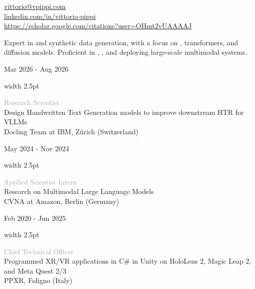 \documentclass[10pt,a4paper]{article}
\newcommand{\cvsection}[1]{
    \vspace{2.2ex}
    \noindent{\Large \textcolor{darkgray}{#1}}
    \vspace{0.8ex}\par
}
\newcommand{\cventry}[3]{
    \par\noindent
    \begin{minipage}[t]{0.19\textwidth}
        \raggedleft \footnotesize \textcolor{textgray}{#2}
    \end{minipage}%
    \hspace{0.015\textwidth}%
    \textcolor{#1}{\vrule width 2.5pt}%
    \hspace{0.015\textwidth}%
    \begin{minipage}[t]{0.75\textwidth}
        \footnotesize #3
    \end{minipage}
    \par\vspace{0.6ex}
}
\begin{document}
\pagestyle{empty}
\linespread{0.95}\selectfont

\noindent{\huge \textcolor{darkgray}{Vittorio Pippi}}\vspace{1.2ex}

\noindent
\footnotesize
\textcolor{linkgray}{\faEnvelope} \hspace{0.5ex} \href{mailto:vittorio@vpippi.com}{\underline{\textcolor{linkgray}{vittorio@vpippi.com}}} \hspace{2ex} \\
\textcolor{linkgray}{\faLinkedin} \hspace{0.5ex} \href{https://www.linkedin.com/in/vittorio-pippi/}{\underline{\textcolor{linkgray}{linkedin.com/in/vittorio-pippi}}} \\
\textcolor{linkgray}{\faGraduationCap} \hspace{0.5ex} \href{https://scholar.google.com/citations?user=OHmt2vUAAAAJ}{\underline{\textcolor{linkgray}{https://scholar.google.com/citations?user=OHmt2vUAAAAJ}}}
\vspace{0.5ex}

\cvsection{Technical Summary}
\noindent\textcolor{textgray}{\footnotesize
Expert in  and synthetic data generation, with a focus on , transformers, and \\
diffusion models. Proficient in , , and deploying large-scale multimodal systems.}

\cvsection{Work Experience}

\cventry{we1}{Mar 2026 - Aug 2026}{\textcolor{darkgray}{Research Scientist} \\ \textcolor{textgray}{Design Handwritten Text Generation models to improve downstream HTR for VLLMs \\ Docling Team at IBM, Zürich (Switzerland)}}

\cventry{we1}{May 2024 - Nov 2024}{\textcolor{darkgray}{Applied Scientist Intern} \\ \textcolor{textgray}{Research on Multimodal Large Language Models \\ CVNA at Amazon, Berlin (Germany)}}

\cventry{we2}{Feb 2020 - Jun 2025}{\textcolor{darkgray}{Chief Technical Officer} \\ \textcolor{textgray}{Programmed XR/VR applications in C\# in Unity on HoloLens 2, Magic Leap 2, and Meta Quest 2/3 \\ PPXR, Foligno (Italy)}}
\end{document}
